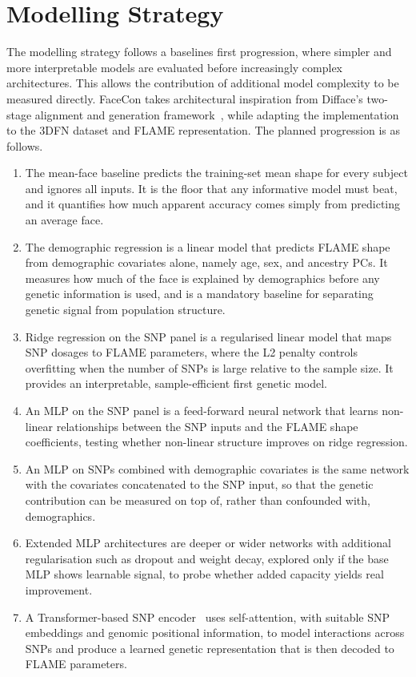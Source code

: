 \section{Modelling Strategy}
The modelling strategy follows a baselines first progression, where simpler and more interpretable models are evaluated before increasingly complex architectures. This allows the contribution of additional model complexity to be measured directly. FaceCon takes architectural inspiration from Difface's two-stage alignment and generation framework~\cite{ref:difface}, while adapting the implementation to the 3DFN dataset and FLAME representation. The planned progression is as follows.
\begin{enumerate}
\item The mean-face baseline predicts the training-set mean shape for every subject and ignores all inputs. It is the floor that any informative model must beat, and it quantifies how much apparent accuracy comes simply from predicting an average face.
\item The demographic regression is a linear model that predicts FLAME shape from demographic covariates alone, namely age, sex, and ancestry PCs. It measures how much of the face is explained by demographics before any genetic information is used, and is a mandatory baseline for separating genetic signal from population structure.
\item Ridge regression on the SNP panel is a regularised linear model that maps SNP dosages to FLAME parameters, where the L2 penalty controls overfitting when the number of SNPs is large relative to the sample size. It provides an interpretable, sample-efficient first genetic model.
\item An MLP on the SNP panel is a feed-forward neural network that learns non-linear relationships between the SNP inputs and the FLAME shape coefficients, testing whether non-linear structure improves on ridge regression.
\item An MLP on SNPs combined with demographic covariates is the same network with the covariates concatenated to the SNP input, so that the genetic contribution can be measured on top of, rather than confounded with, demographics.
\item Extended MLP architectures are deeper or wider networks with additional regularisation such as dropout and weight decay, explored only if the base MLP shows learnable signal, to probe whether added capacity yields real improvement.
\item A Transformer-based SNP encoder~\cite{ref:transformer} uses self-attention, with suitable SNP embeddings and genomic positional information, to model interactions across SNPs and produce a learned genetic representation that is then decoded to FLAME parameters.

\end{enumerate}
